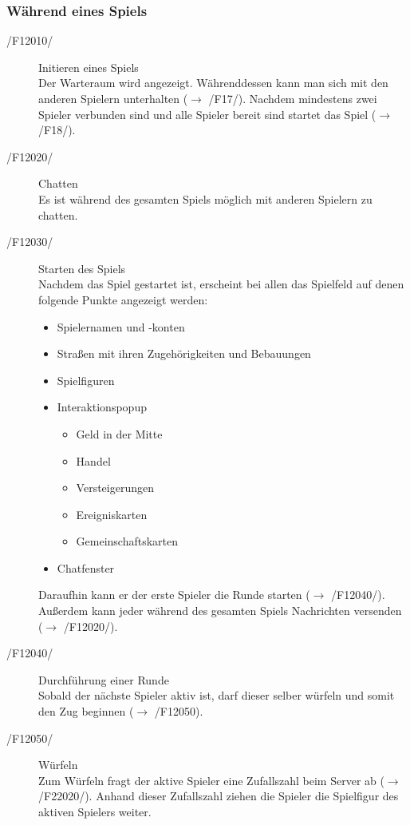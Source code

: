 \documentclass[a4paper,10pt]{article}
\begin{document}
\subsubsection{Während eines Spiels}
\begin{description}
\item[/F12010/] Initieren eines Spiels \\
Der Warteraum wird angezeigt. Währenddessen kann man sich mit den anderen Spielern unterhalten ($\rightarrow$ /F17/). Nachdem mindestens zwei Spieler verbunden sind und alle Spieler bereit sind startet das Spiel ($\rightarrow$ /F18/).
\item[/F12020/] Chatten \\
Es ist während des gesamten Spiels möglich mit anderen Spielern zu chatten.
\item[/F12030/] Starten des Spiels \\
Nachdem das Spiel gestartet ist, erscheint bei allen das Spielfeld auf denen folgende Punkte angezeigt werden:
\begin{itemize}
\item Spielernamen und -konten
\item Straßen mit ihren Zugehörigkeiten und Bebauungen
\item Spielfiguren
\item Interaktionspopup
\begin{itemize}
\item Geld in der Mitte
\item Handel
\item Versteigerungen
\item Ereigniskarten
\item Gemeinschaftskarten
\end{itemize}
\item Chatfenster
\end{itemize}
Daraufhin kann er der erste Spieler die Runde starten ($\rightarrow$ /F12040/). Außerdem kann jeder während des gesamten Spiels Nachrichten versenden ($\rightarrow$ /F12020/).
\item[/F12040/] Durchführung einer Runde \\
Sobald der nächste Spieler aktiv ist, darf dieser selber würfeln und somit den Zug beginnen ($\rightarrow$ /F12050).
\item[/F12050/] Würfeln \\
Zum Würfeln fragt der aktive Spieler eine Zufallszahl beim Server ab ($\rightarrow$ /F22020/). Anhand dieser Zufallszahl ziehen die Spieler die Spielfigur des aktiven Spielers weiter.


\end{description}
\end{document}
